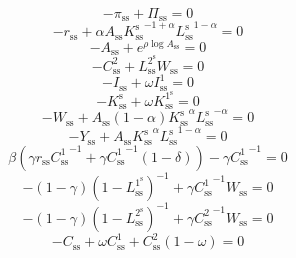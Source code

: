 \begin{equation}
-\pi_\mathrm{ss} + \Pi_\mathrm{ss} = 0
\end{equation}
\begin{equation}
-r_\mathrm{ss} + {\alpha} {A_\mathrm{ss}} {{K^{\mathrm{s}}_\mathrm{ss}}^{-1 + \alpha}} {{L^{\mathrm{s}}_\mathrm{ss}}^{1 - \alpha}} = 0
\end{equation}
\begin{equation}
-A_\mathrm{ss} + e^{{\rho} {\log{A_\mathrm{ss}}}} = 0
\end{equation}
\begin{equation}
-C^{\mathrm{2}}_\mathrm{ss} + {L^{\mathrm{2}^{\mathrm{s}}}_\mathrm{ss}} {W_\mathrm{ss}} = 0
\end{equation}
\begin{equation}
-I_\mathrm{ss} + {\omega} {I^{\mathrm{1}}_\mathrm{ss}} = 0
\end{equation}
\begin{equation}
-K^{\mathrm{s}}_\mathrm{ss} + {\omega} {K^{\mathrm{1}^{\mathrm{s}}}_\mathrm{ss}} = 0
\end{equation}
\begin{equation}
-W_\mathrm{ss} + {A_\mathrm{ss}} \left(1 - \alpha\right) {{K^{\mathrm{s}}_\mathrm{ss}}^{\alpha}} {{L^{\mathrm{s}}_\mathrm{ss}}^{-\alpha}} = 0
\end{equation}
\begin{equation}
-Y_\mathrm{ss} + {A_\mathrm{ss}} {{K^{\mathrm{s}}_\mathrm{ss}}^{\alpha}} {{L^{\mathrm{s}}_\mathrm{ss}}^{1 - \alpha}} = 0
\end{equation}
\begin{equation}
{\beta} \left({\gamma} {r_\mathrm{ss}} {C^{\mathrm{1}}_\mathrm{ss}}^{-1} + {\gamma} {C^{\mathrm{1}}_\mathrm{ss}}^{-1} \left(1 - \delta\right)\right) - {\gamma} {C^{\mathrm{1}}_\mathrm{ss}}^{-1} = 0
\end{equation}
\begin{equation}
-\left(1 - \gamma\right) \left(1 - L^{\mathrm{1}^{\mathrm{s}}}_\mathrm{ss}\right)^{-1} + {\gamma} {C^{\mathrm{1}}_\mathrm{ss}}^{-1} {W_\mathrm{ss}} = 0
\end{equation}
\begin{equation}
-\left(1 - \gamma\right) \left(1 - L^{\mathrm{2}^{\mathrm{s}}}_\mathrm{ss}\right)^{-1} + {\gamma} {C^{\mathrm{2}}_\mathrm{ss}}^{-1} {W_\mathrm{ss}} = 0
\end{equation}
\begin{equation}
-C_\mathrm{ss} + {\omega} {C^{\mathrm{1}}_\mathrm{ss}} + {C^{\mathrm{2}}_\mathrm{ss}} \left(1 - \omega\right) = 0
\end{equation}
